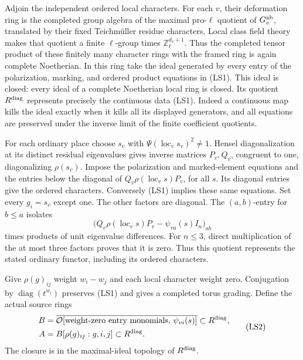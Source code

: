 Adjoin the independent ordered local characters.
For each \(v\), their deformation ring is the
completed group algebra of the maximal pro-\(\ell\)
quotient of \(G_v^{\rm ab}\), translated by their
fixed Teichm\"uller residue characters.
Local class field theory makes that quotient a
finite \(\ell\)-group times \(\mathbb Z_\ell^{d_v+1}\).
Thus the completed tensor product of these finitely
many character rings with the framed ring is again
complete Noetherian.
In this ring take the ideal generated by every
entry of the polarization, marking, and ordered
product equations in (LS1).
This ideal is closed: every ideal of a complete
Noetherian local ring is closed.
Its quotient \(R^{\rm diag}\) represents precisely
the continuous data (LS1).
Indeed a continuous map kills the ideal exactly
when it kills all its displayed generators, and
all equations are preserved under the inverse
limit of the finite coefficient quotients.

For each ordinary place choose \(s_v\) with
\(\Psi(\operatorname{loc}_v s_v)^2\ne1\).
Hensel diagonalization at its distinct residual
eigenvalues gives inverse matrices \(P_v,Q_v\),
congruent to one, diagonalizing \(\rho(s_v)\).
Impose the polarization and marked-element
equations and the entries below the diagonal of
\(Q_v\rho(\operatorname{loc}_v s)P_v\), for all \(s\).
Its diagonal entries give the ordered characters.
Conversely (LS1) implies these same equations.
Set every \(g_i=s_v\) except one.
The other factors are diagonal.
The \((a,b)\)-entry for \(b\le a\) isolates
\[
       \bigl(Q_v\rho(\operatorname{loc}_v s)P_v
                            -\psi_{va}(s)I_n\bigr)_{ab}
\]
times products of unit eigenvalue differences.
For \(n\le3\), direct multiplication of the at
most three factors proves that it is zero.
Thus this quotient represents the stated ordinary
functor, including its ordered characters.

Give \(\rho(g)_{ij}\) weight \(w_i-w_j\) and each
local character weight zero.
Conjugation by \(\operatorname{diag}(t^{w_i})\)
preserves (LS1) and gives a completed torus grading.
Define the actual source rings
\[
 \begin{split}
 B&=\overline{\mathcal O[
       \text{weight-zero entry monomials},\,\psi_{vi}(s)]}
                                \subset R^{\rm diag},\\
 A&=B[\rho(g)_{ij}:g,i,j]\subset R^{\rm diag}.
 \end{split}                                                  \tag{LS2}
\]
The closure is in the maximal-ideal topology of
\(R^{\rm diag}\).

